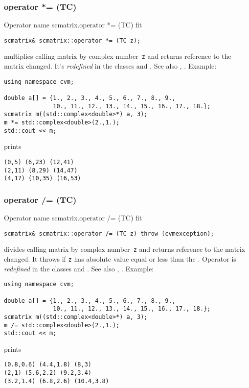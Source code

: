 \subsubsection{operator *= (TC)}
Operator%
\pdfdest name {scmatrix.operator *= (TC)} fit
\begin{verbatim}
scmatrix& scmatrix::operator *= (TC z);
\end{verbatim}
multiplies  calling matrix by  complex number~\verb"z"
and returns  reference to
the matrix changed.
It's \emph{redefined} in the classes
and .
See also ,
.
Example:
\begin{Verbatim}
using namespace cvm;

double a[] = {1., 2., 3., 4., 5., 6., 7., 8., 9.,
              10., 11., 12., 13., 14., 15., 16., 17., 18.};
scmatrix m((std::complex<double>*) a, 3);
m *= std::complex<double>(2.,1.);
std::cout << m;
\end{Verbatim}
prints
\begin{Verbatim}
(0,5) (6,23) (12,41)
(2,11) (8,29) (14,47)
(4,17) (10,35) (16,53)
\end{Verbatim}
\newpage



\subsubsection{operator /= (TC)}
Operator%
\pdfdest name {scmatrix.operator /= (TC)} fit
\begin{verbatim}
scmatrix& scmatrix::operator /= (TC z) throw (cvmexception);
\end{verbatim}
divides  calling matrix by  complex number~\verb"z"
and returns  reference to
the matrix changed.
It throws  
if \verb"z" has  absolute value equal or less
than the 
.
Operator is \emph{redefined} in the classes
and .
See also ,
.
Example:
\begin{Verbatim}
using namespace cvm;

double a[] = {1., 2., 3., 4., 5., 6., 7., 8., 9.,
              10., 11., 12., 13., 14., 15., 16., 17., 18.};
scmatrix m((std::complex<double>*) a, 3);
m /= std::complex<double>(2.,1.);
std::cout << m;
\end{Verbatim}
prints
\begin{Verbatim}
(0.8,0.6) (4.4,1.8) (8,3)
(2,1) (5.6,2.2) (9.2,3.4)
(3.2,1.4) (6.8,2.6) (10.4,3.8)
\end{Verbatim}
\newpage



